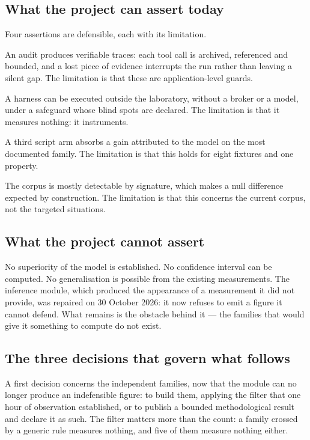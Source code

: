 \subsection{What the project can assert today}

Four assertions are defensible, each with its limitation.

An audit produces verifiable traces: each tool call is archived, referenced and bounded, and a lost piece of evidence interrupts the run rather than leaving a silent gap. The limitation is that these are application-level guards.

A harness can be executed outside the laboratory, without a broker or a model, under a safeguard whose blind spots are declared. The limitation is that it measures nothing: it instruments.

A third script arm absorbs a gain attributed to the model on the most documented family. The limitation is that this holds for eight fixtures and one property.

The corpus is mostly detectable by signature, which makes a null difference expected by construction. The limitation is that this concerns the current corpus, not the targeted situations.

\subsection{What the project cannot assert}

No superiority of the model is established. No confidence interval can be computed. No generalisation is possible from the existing measurements. The inference module, which produced the appearance of a measurement it did not provide, was repaired on 30 October 2026: it now refuses to emit a figure it cannot defend. What remains is the obstacle behind it — the families that would give it something to compute do not exist.

\subsection{The three decisions that govern what follows}

A first decision concerns the independent families, now that the module can no longer produce an indefensible figure: to build them, applying the filter that one hour of observation established, or to publish a bounded methodological result and declare it as such. The filter matters more than the count: a family crossed by a generic rule measures nothing, and five of them measure nothing either.


